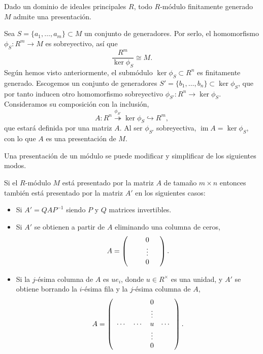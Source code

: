 \label{fgfp} Dado un dominio de ideales principales
\(R\), todo \(R\)-módulo finitamente generado \(M\) admite una
presentación. 


Sea \(S=\{a_1,\dots,a_m\}\subset M\) un conjunto de generadores. Por
serlo, el homomorfismo \(\phi_S\colon R^m\rightarrow M\) es
sobreyectivo, así que \[\frac{R^m}{\ker\phi_{S}}\cong M.\] Según hemos
visto anteriormente, el submódulo \(\ker \phi_S\subset R^n\) es
finitamente generado. Escogemos un conjunto de generadores
\(S'=\{b_1,\dots,b_n\}\subset \ker \phi_{S}\), que por tanto
inducen otro homomorfismo sobreyectivo
\(\phi_{S'}\colon R^n\rightarrow \ker \phi_{S}\). Consideramos su
composición con la inclusión,
\[A\colon R^n\stackrel{\phi_{S'}}\twoheadrightarrow \ker \phi_S\hookrightarrow R^m,\]
que estará definida por una matriz \(A\). Al ser \(\phi_{S'}\)
sobreyectiva, \(\operatorname{im}A=\ker \phi_{S}\), con lo que \(A\) es
una presentación de \(M\). 

Una presentación de un módulo se puede modificar y simplificar de los
siguientes modos.

\label{simplify} Si el \(R\)-módulo \(M\) está
presentado por la matriz \(A\) de tamaño \(m\times n\) entonces también
está presentado por la matriz \(A'\) en los siguientes casos:

\begin{itemize}
\item
  Si \(A'=QAP^{-1}\) siendo \(P\) y \(Q\) matrices invertibles.
\item
  Si \(A'\) se obtienen a partir de \(A\) eliminando una columna de
  ceros, \[
  A=\left(
  \begin{array}{cccc}
  &&0&\cr
  &&\vdots&\cr
  &&0&
  \end{array}
  \right).
  \]
\item
  Si la \(j\)-ésima columna de \(A\) es \(ue_i\), donde
  \(u\in R^\times\) es una unidad, y \(A'\) se obtiene borrando la
  \(i\)-ésima fila y la \(j\)-ésima columna de \(A\), \[
  A=\left(
  \begin{array}{cccc}
  &&0&\cr
  &&\vdots&\cr
  \cdots&\cdots&u&\cdots\cr
  &&\vdots&\cr
  &&0&\cr
  \end{array}
  \right).
  \]
\end{itemize}




